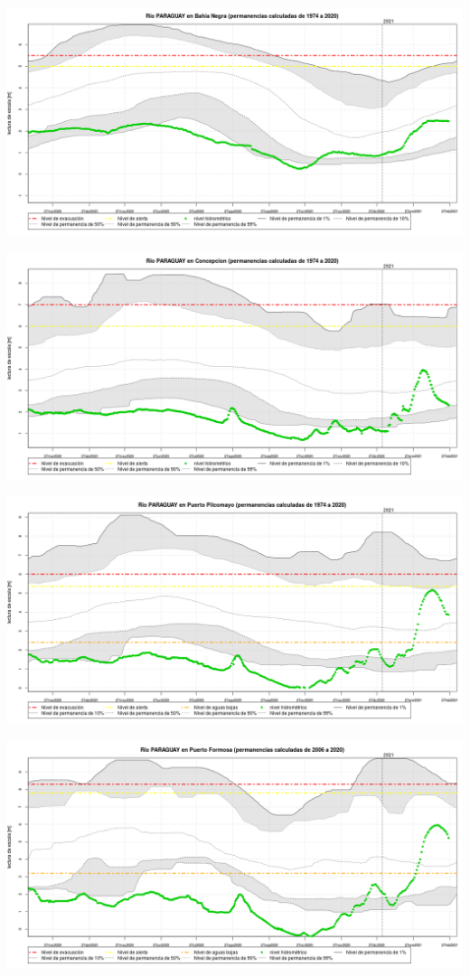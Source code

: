 \documentclass[11pt,spanish] {article}
\begin{document}
\pagebreak
\begin{center}
\includegraphics[width=17cm]{niveles_bneg.png}

\includegraphics[width=17cm]{niveles_conc.png}

\includegraphics[width=17cm]{niveles_pilc.png}

\includegraphics[width=17cm]{niveles_form.png}
\end{center}
\end{document}
